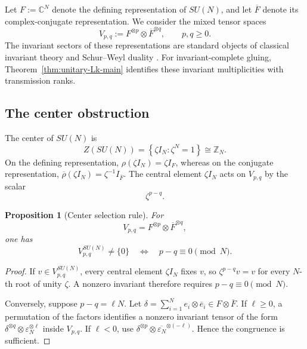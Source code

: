 \documentclass[11pt]{article}
\theoremstyle{plain}
\newtheorem{proposition}[theorem]{Proposition}
\theoremstyle{definition}
\begin{document}
Let \(F:=\mathbb C^N\) denote the defining representation of \(SU(N)\), and let \(\overline F\)
denote its complex-conjugate representation. We consider the mixed tensor
spaces
\begin{equation}
\label{eq:Vpq}
V_{p,q}
:=
F^{\otimes p}\otimes\overline F^{\otimes q},
\qquad
p,q\geq0.
\end{equation}
The invariant sectors of these representations are standard objects of
classical invariant theory and Schur--Weyl duality
\citep{Weyl1997ClassicalGroups,FultonHarris1991,GoodmanWallach2009,
Howe1989ClassicalInvariantTheory}.
For invariant-complete gluing, Theorem~\ref{thm:unitary-Lk-main} identifies these invariant multiplicities with transmission ranks.

\subsection{The center obstruction}
\label{subsec:center-obstruction}

The center of \(SU(N)\) is
\[
Z(SU(N))
=
\left\{
\zeta I_N:\zeta^N=1
\right\}
\cong
\mathbb Z_N.
\]
On the defining representation,
\(\rho(\zeta I_N)=\zeta I_F\),
whereas on the conjugate representation,
\(\overline\rho(\zeta I_N) = \zeta^{-1}I_{\overline F}\).
The central element \(\zeta I_N\) acts on \(V_{p,q}\) by the scalar
\begin{equation}
\label{eq:center-action}
\zeta^{p-q}.
\end{equation}

\begin{proposition}[Center selection rule]
\label{prop:center-selection}
For
\[
V_{p,q}=F^{\otimes p}\otimes\overline F^{\otimes q},
\]
one has
\[
V_{p,q}^{SU(N)}\neq\{0\}
\quad\Longleftrightarrow\quad
p-q\equiv0\pmod N.
\]
\end{proposition}

\begin{proof}
If \(v\in V_{p,q}^{SU(N)}\), every central element \(\zeta I_N\) fixes \(v\), so \(\zeta^{p-q}v=v\) for every \(N\)-th root of unity \(\zeta\). A nonzero invariant therefore requires
\(p-q\equiv0\pmod N\).

Conversely, suppose \(p-q=\ell N\). Let
\(\delta=\sum_{i=1}^{N}e_i\otimes\overline e_i\in F\otimes\overline F\).
If \(\ell\geq0\), a permutation of the factors identifies a nonzero invariant tensor of the form \(\delta^{\otimes q}\otimes\varepsilon_N^{\otimes\ell}\) inside \(V_{p,q}\). If \(\ell<0\), use
\(\delta^{\otimes p}\otimes\overline{\varepsilon_N}^{\otimes(-\ell)}\).
Hence the congruence is sufficient.
\end{proof}
\end{document}
